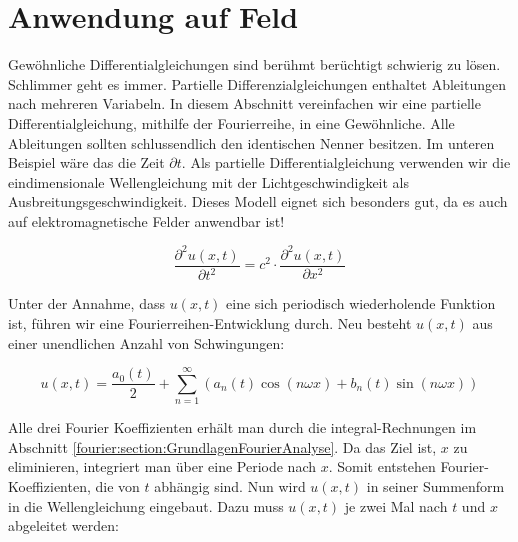 %
%
%
%



\section{Anwendung auf Feld\label{fourier:section:teil0}}

Gewöhnliche Differentialgleichungen sind berühmt berüchtigt schwierig zu lösen.
Schlimmer geht es immer.
Partielle Differenzialgleichungen enthaltet Ableitungen nach mehreren Variabeln.
In diesem Abschnitt vereinfachen wir eine partielle Differentialgleichung, mithilfe der Fourierreihe, in eine Gewöhnliche.
Alle Ableitungen sollten schlussendlich den identischen Nenner besitzen. 
Im unteren Beispiel wäre das die Zeit $\partial t$.
Als partielle Differentialgleichung verwenden wir die eindimensionale Wellengleichung mit der Lichtgeschwindigkeit als Ausbreitungsgeschwindigkeit. 
Dieses Modell eignet sich besonders gut, da es auch auf elektromagnetische Felder anwendbar ist!

\begin{equation}
	\frac{\partial^2 u(x, t)}{\partial t^2} = c^2 \cdot \frac{\partial^2 u(x, t)}{\partial x^2}
\end{equation}

Unter der Annahme, dass $u(x, t)$ eine sich periodisch wiederholende Funktion ist, führen wir eine Fourierreihen-Entwicklung durch. 
Neu besteht $u(x, t)$ aus einer unendlichen Anzahl von Schwingungen:

\begin{equation}
	u(x,t) = \frac{a_0(t)}{2} + \sum_{n=1}^{\infty} \left( a_n(t) \cos(n \omega x) + b_n(t) \sin(n \omega x) \right)
\end{equation}

Alle drei Fourier Koeffizienten erhält man durch die integral-Rechnungen im Abschnitt \ref{fourier:section:GrundlagenFourierAnalyse}. 
Da das Ziel ist, $x$ zu eliminieren, integriert man über eine Periode nach $x$.
Somit entstehen Fourier-Koeffizienten, die von $t$ abhängig sind. 
Nun wird $u(x,t)$ in seiner Summenform in die Wellengleichung eingebaut. 
Dazu muss $u(x,t)$ je zwei Mal nach $t$ und $x$ abgeleitet werden:


